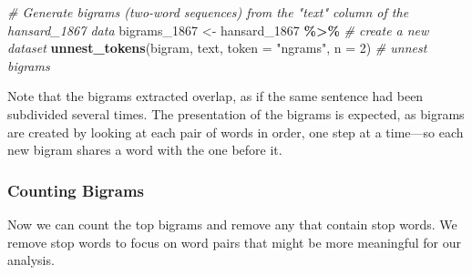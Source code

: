 \documentclass[
]{article}
\newenvironment{Shaded}{\begin{snugshade}}{\end{snugshade}}
\newcommand{\AttributeTok}[1]{\textcolor[rgb]{0.13,0.29,0.53}{#1}}
\newcommand{\CommentTok}[1]{\textcolor[rgb]{0.56,0.35,0.01}{\textit{#1}}}
\newcommand{\DecValTok}[1]{\textcolor[rgb]{0.00,0.00,0.81}{#1}}
\newcommand{\FunctionTok}[1]{\textcolor[rgb]{0.13,0.29,0.53}{\textbf{#1}}}
\newcommand{\NormalTok}[1]{#1}
\newcommand{\OtherTok}[1]{\textcolor[rgb]{0.56,0.35,0.01}{#1}}
\newcommand{\SpecialCharTok}[1]{\textcolor[rgb]{0.81,0.36,0.00}{\textbf{#1}}}
\newcommand{\StringTok}[1]{\textcolor[rgb]{0.31,0.60,0.02}{#1}}
\begin{document}
\begin{Shaded}
\begin{Highlighting}[]
\CommentTok{\# Generate bigrams (two{-}word sequences) from the "text" column of the hansard\_1867 data}
\NormalTok{bigrams\_1867 }\OtherTok{\textless{}{-}}\NormalTok{ hansard\_1867 }\SpecialCharTok{\%\textgreater{}\%} \CommentTok{\# create a new dataset}
  \FunctionTok{unnest\_tokens}\NormalTok{(bigram, text, }\AttributeTok{token =} \StringTok{"ngrams"}\NormalTok{, }\AttributeTok{n =} \DecValTok{2}\NormalTok{) }\CommentTok{\# unnest bigrams }
\end{Highlighting}
\end{Shaded}

\begin{table}
\centering
\caption{\label{tab:unnamed-chunk-13}Raw bigrams extracted from the 1867 Hansard proceedings alongside their associated metadata.}
\centering
{}
\end{table}

Note that the bigrams extracted overlap, as if the same sentence had
been subdivided several times. The presentation of the bigrams is
expected, as bigrams are created by looking at each pair of words in
order, one step at a time---so each new bigram shares a word with the
one before it.

\subsubsection{Counting Bigrams}\label{counting-bigrams}

Now we can count the top bigrams and remove any that contain stop words.
We remove stop words to focus on word pairs that might be more
meaningful for our analysis.
\end{document}
